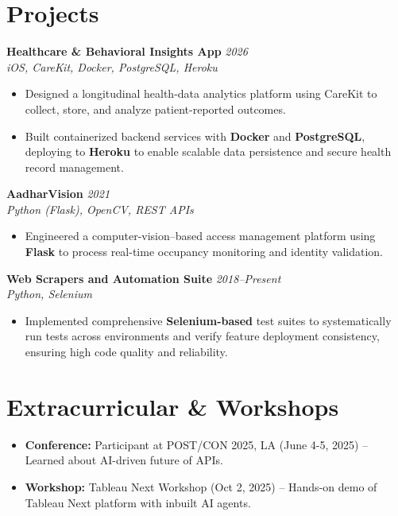 \documentclass[letterpaper,11pt]{article}
\begin{document}
\section*{Projects}

\textbf{Healthcare \& Behavioral Insights App} \hfill \textit{2026} \\
\textit{iOS, CareKit, Docker, PostgreSQL, Heroku}
\begin{itemize} \itemsep -2pt
    \item Designed a longitudinal health-data analytics platform using CareKit to collect, store, and analyze patient-reported outcomes.
    \item Built containerized backend services with \textbf{Docker} and \textbf{PostgreSQL}, deploying to \textbf{Heroku} to enable scalable data persistence and secure health record management.
\end{itemize}

\textbf{AadharVision} \hfill \textit{2021} \\
\textit{Python (Flask), OpenCV, REST APIs}
\begin{itemize} \itemsep -2pt
    \item Engineered a computer-vision–based access management platform using \textbf{Flask} to process real-time occupancy monitoring and identity validation.
\end{itemize}

\textbf{Web Scrapers and Automation Suite} \hfill \textit{2018--Present} \\
\textit{Python, Selenium}
\begin{itemize} \itemsep -2pt
    \item Implemented comprehensive \textbf{Selenium-based} test suites to systematically run tests across environments and verify feature deployment consistency, ensuring high code quality and reliability.
\end{itemize}

\section*{Extracurricular \& Workshops}
\begin{itemize} \itemsep -2pt
    \item \textbf{Conference:} Participant at POST/CON 2025, LA (June 4-5, 2025) -- Learned about AI-driven future of APIs.
    \item \textbf{Workshop:} Tableau Next Workshop (Oct 2, 2025) -- Hands-on demo of Tableau Next platform with inbuilt AI agents.
\end{itemize}
\end{document}
